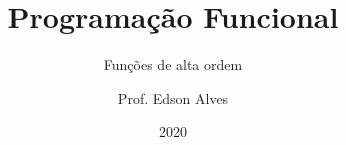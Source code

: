 \title{Programação Funcional}
\subtitle{Funções de alta ordem}
\date{2020}
\author{Prof. Edson Alves}
